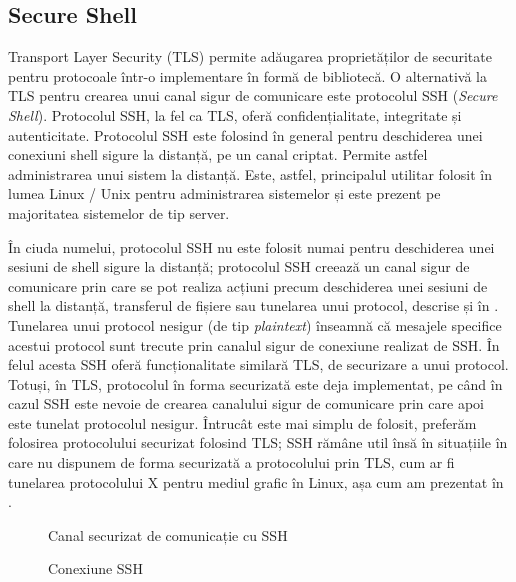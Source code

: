 \subsection{Secure Shell}
\label{sec:sec:transfer:ssh}

Transport Layer Security (TLS) permite adăugarea proprietăților de securitate pentru protocoale într-o implementare în formă de bibliotecă. O alternativă la TLS pentru crearea unui canal sigur de comunicare este protocolul SSH (\textit{Secure Shell}). Protocolul SSH, la fel ca TLS, oferă confidențialitate, integritate și autenticitate. Protocolul SSH este folosind în general pentru deschiderea unei conexiuni shell sigure la distanță, pe un canal criptat. Permite astfel administrarea unui sistem la distanță. Este, astfel, principalul utilitar folosit în lumea Linux / Unix pentru administrarea sistemelor și este prezent pe majoritatea sistemelor de tip server.

În ciuda numelui, protocolul SSH nu este folosit numai pentru deschiderea unei sesiuni de shell sigure la distanță; protocolul SSH creează un canal sigur de comunicare prin care se pot realiza acțiuni precum deschiderea unei sesiuni de shell la distanță, transferul de fișiere sau tunelarea unui protocol, descrise și în . Tunelarea unui protocol nesigur (de tip \textit{plaintext}) înseamnă că mesajele specifice acestui protocol sunt trecute prin canalul sigur de conexiune realizat de SSH. În felul acesta SSH oferă funcționalitate similară TLS, de securizare a unui protocol. Totuși, în TLS, protocolul în forma securizată este deja implementat, pe când în cazul SSH este nevoie de crearea canalului sigur de comunicare prin care apoi este tunelat protocolul nesigur. Întrucât este mai simplu de folosit, preferăm folosirea protocolului securizat folosind TLS; SSH rămâne util însă în situațiile în care nu dispunem de forma securizată a protocolului prin TLS, cum ar fi tunelarea protocolului X pentru mediul grafic în Linux, așa cum am prezentat în .

\begin{figure}[htbp]
  \centering
  \def\svgwidth{\columnwidth}
  
  \caption{Canal securizat de comunicație cu SSH}
  \label{fig:sec:ssh-channel}
\end{figure}

\begin{figure}[htbp]
  \centering
  \def\svgwidth{\columnwidth}
  
  \caption{Conexiune SSH}
  \label{fig:sec:ssh-session}
\end{figure}

